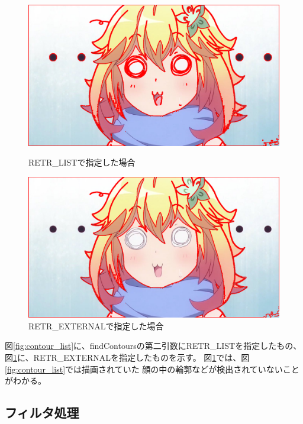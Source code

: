 \documentclass[dvipdfmx]{jsarticle}
\begin{document}
\begin{figure}[htbp]
  \begin{minipage}{0.5\hsize}
    \begin{center}
      \includegraphics[width=0.9\hsize]{../pic/contour1_list.png}
    \end{center}
    \caption{RETR\_LISTで指定した場合}
    \label{fig:contour_list}
  \end{minipage}
  \begin{minipage}{0.5\hsize}
    \begin{center}
      \includegraphics[width=0.9\hsize]{../pic/contour1_external.png}
    \end{center}
    \caption{RETR\_EXTERNALで指定した場合}
    \label{fig:contour_external}
  \end{minipage}
\end{figure}

図\ref{fig:contour_list}に、findContoursの第二引数にRETR\_LISTを指定したもの、
図\ref{fig:contour_external}に、RETR\_EXTERNALを指定したものを示す。
図\ref{fig:contour_external}では、図\ref{fig:contour_list}では描画されていた
顔の中の輪郭などが検出されていないことがわかる。


\subsection{フィルタ処理}
\end{document}
